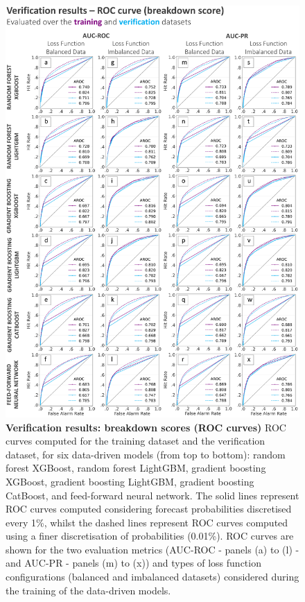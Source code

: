 \begin{figure}[htbp]
\centering
\includegraphics[width=\textwidth]{verif_training_test_breakdown_roc_curve.png}
\caption{\textbf{Verification results: breakdown scores (ROC curves)} ROC curves computed for the \textcolor{colourTraining}{training dataset} and the \textcolor{colourTest}{verification dataset}, for six data-driven models (from top to bottom): random forest XGBoost, random forest LightGBM, gradient boosting XGBoost, gradient boosting LightGBM, gradient boosting CatBoost, and feed-forward neural network. The solid lines represent ROC curves computed considering forecast probabilities discretised every 1\%, whilst the dashed lines represent ROC curves computed using a finer discretisation of probabilities (0.01\%). ROC curves are shown for the two evaluation metrics (AUC-ROC - panels (a) to (l) - and AUC-PR - panels (m) to (x)) and types of loss function configurations (balanced and imbalanced datasets) considered during the training of the data-driven models.}
\label{fig:verif_training_test_breakdown_roc_curve}
\end{figure}


